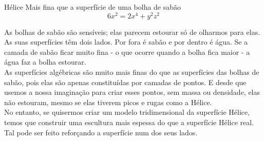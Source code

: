 \begin{surferPage}{Hélice}
Mais fina  que a superf\'icie de uma bolha de sab\~ao\\
  \smallskip
\[6x^2	= 2x^4	+ y^2	z^2\]

\singlespacing
As bolhas de sab\~ao s\~ao sens\'iveis; elas parecem estourar s\'o de olharmos para elas. As suas superf\'icies t\^em dois lados. Por fora \'e sab\~ao e por dentro \'e \'agua. Se a camada de sab\~ao ficar muito fina - o que ocorre quando a bolha fica maior - a \'agua faz a bolha estourar.\\
\vspace{0,3cm}
As superf\'icies alg\'ebricas s\~ao muito mais finas do que as superf\'icies das bolhas de sab\~ao, pois elas s\~ao apenas constitu\'idas por camadas de pontos. E desde que usemos a nossa imagina\c c\~ao para criar esses pontos, sem massa ou densidade, elas n\~ao estouram, mesmo se elas tiverem picos e rugas como a H\'elice.\\
\vspace{0,3cm}
No entanto, se  quisermos criar um modelo tridimensional da superf\'icie H\'elice, temos que construir uma escultura mais espessa do que a superf\'icie H\'elice real. Tal pode ser feito  refor\c cando a superf\'icie num dos seus lados.
\end{surferPage}
